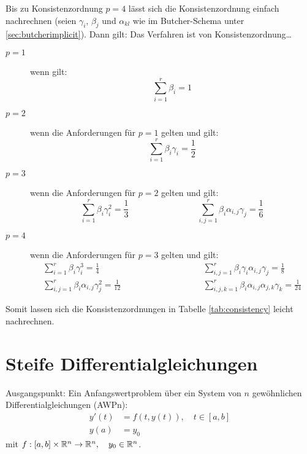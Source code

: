 				Bis zu Konsistenzordnung \( p = 4 \) lässt sich die Konsistenzordnung einfach nachrechnen (seien \( \gamma_i \), \( \beta_j \) und \( \alpha_{kl} \) wie im Butcher-Schema unter \ref{sec:butcherimplicit}). Dann gilt: Das Verfahren ist von Konsistenzordnung\dots
				\begin{description}
					\item[\( p = 1 \)] wenn gilt:
						\begin{equation*}
							\sum_{i = 1}^{r} \beta_i = 1
						\end{equation*}
					\item[\( p = 2 \)] wenn die Anforderungen für \( p = 1 \) gelten und gilt:
						\begin{equation*}
							\sum_{i=1}^{r} \beta_i \gamma_i = \frac{1}{2}
						\end{equation*}
					\item[\( p = 3 \)] wenn die Anforderungen für \( p = 2 \) gelten und gilt:
						\begin{equation*}
							\sum_{i=1}^{r} \beta_i \gamma_i^2 = \frac{1}{3} \qquad\qquad\qquad\qquad \sum_{i, j = 1}^{r} \beta_i \alpha_{i,j} \gamma_j  = \frac{1}{6}
						\end{equation*}
					\item[\( p = 4 \)] wenn die Anforderungen für \( p = 3 \) gelten und gilt:
						\begin{equation*}
							\begin{array}{lcl}
								\displaystyle \sum_{i=1}^{r} \beta_i \gamma_i^3 = \frac{1}{4}                    & \qquad\qquad\qquad\qquad & \displaystyle \sum_{i, j = 1}^{r} \beta_i \gamma_i \alpha_{i,j} \gamma_j     = \frac{1}{8}  \\
								\displaystyle \sum_{i, j = 1}^{r} \beta_i \alpha_{i,j} \gamma_j^2 = \frac{1}{12} &                          & \displaystyle \sum_{i,j,k=1}^{r} \beta_i \alpha_{i,j} \alpha_{j,k} \gamma_k  = \frac{1}{24}
							\end{array}
						\end{equation*}
				\end{description}

				Somit lassen sich die Konsistenzordnungen in Tabelle \ref{tab:consistency} leicht nachrechnen.

	\section{Steife Differentialgleichungen}
		Ausgangspunkt: Ein Anfangswertproblem über ein System von \(n\) gewöhnlichen Differentialgleichungen (AWPn):
		\begin{align*}
			y'(t) & = f(t, y(t)), \quad t \in [a, b] \\
			y(a)  & = y_0
		\end{align*}
		mit \( f : [a, b] \times \mathbb{R}^n \rightarrow \mathbb{R}^n, \quad y_0 \in \mathbb{R}^n \).

